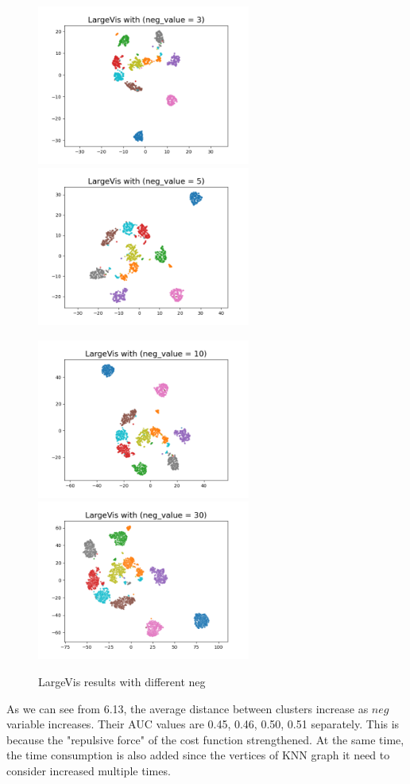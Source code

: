 \begin{figure}[H]
\centering  %
{
\label{Fig.sub.1}
\includegraphics[width=7cm,height=3.5cm\textwidth]{images/largevis/image_largevis_neg3.png}}
{
\label{Fig.sub.2}
\includegraphics[width=7cm,height=3.5cm\textwidth]{images/largevis/image_largevis_neg5.png}}

\centering  %
{
\label{Fig.sub.1}
\includegraphics[width=7cm,height=3.5cm\textwidth]{images/largevis/image_largevis_neg10.png}}
{
\label{Fig.sub.2}
\includegraphics[width=7cm,height=3.5cm\textwidth]{images/largevis/image_largevis_neg30.png}}
\caption{LargeVis results with different neg}
\end{figure}

\noindent As we can see from 6.13, the average distance between clusters increase as $neg$ variable increases. Their AUC values are 0.45, 0.46, 0.50, 0.51 separately. This is because the "repulsive force" of the cost function strengthened. At the same time, the time consumption is also added since the vertices of KNN graph it need to consider increased multiple times. 

